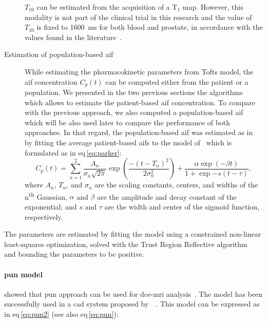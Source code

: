 \begin{description}
      $T_{10}$ can be estimated from the acquisition of a T$_1$ map.
      However, this modality is not part of the clinical trial in this research and the value of $T_{10}$ is fixed to \SI{1600}{\ms} for both blood and prostate, in accordance with the values found in the literature~\cite{fennessy2015quantitative,de2004mr,carr2011magnetic}.
      \item[Estimation of population-based \ac{aif}] While estimating the pharmacokinetic parameters from Tofts model, the \ac{aif} concentration $C_p(t)$ can be computed either from the patient or a population.
        We presented in the two previous sections the algorithms which allows to estimate the patient-based \ac{aif} concentration.
        To compare with the previous approach, we also computed a population-based \ac{aif} which will be also used later to compare the performance of both approaches.
        In that regard, the population-based \ac{aif} was estimated as in~\cite{meng2010comparison} by fitting the average patient-based \ac{aif}s to the model of~\cite{parker2006experimentally} which is formulated as in \ac{eq}\,\eqref{eq:parker}:
        \begin{equation}
          C_p(t) = \sum_{n=1}^{2} \frac{A_n}{\sigma_n \sqrt{2 \pi}} \exp\left(\frac{- (t- T_n)^2}{2\sigma_{n}^{2}}\right) + \frac{\alpha \exp(-\beta t)}{1 + \exp{-s (t - \tau)}} ,
          \label{eq:parker}
        \end{equation}
        \noindent where $A_n$, $T_n$, and $\sigma_n$ are the scaling constants, centers, and widths of the n\textsuperscript{th} Gaussian, $\alpha$ and $\beta$ are the amplitude and decay constant of the exponential; and $s$ and $\tau$ are the width and center of the sigmoid function, respectively.
\end{description}

The parameters are estimated by fitting the model using a constrained non-linear least-squares optimization, solved with the Trust Region Reflective algorithm~\cite{sorensen1982newton} and bounding the parameters to be positive.

\paragraph{\acs*{pun} model}\label{par:chp5:DCE-norm:pun}

\citeauthor{gliozzi2011phenomenological} showed that \ac{pun} approach can be used for \ac{dce}-\ac{mri} analysis~\cite{gliozzi2011phenomenological}.
The model has been successfully used in a \ac{cad} system proposed by~\citeauthor{giannini2015fully}~\cite{giannini2015fully}.
This model can be expressed as in \ac{eq}\,\eqref{eq:pun2} (see also \ac{eq}\,\eqref{eq:pun}):

